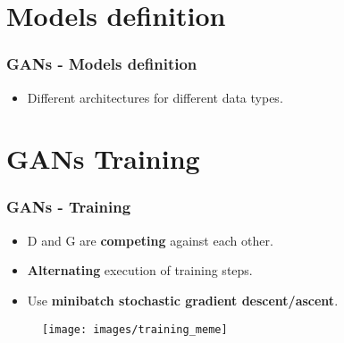 \documentclass{beamer}
\begin{document}
\section{Models definition}

\begin{frame}
	\frametitle{GANs - Models definition}
	\begin{itemize}
		\item Different architectures for different data types.
		\begin{itemize}
		\end{itemize}
	\end{itemize}



\end{frame}

\section{GANs Training}

\begin{frame}
	\frametitle{GANs - Training}
	\begin{itemize}
		\item D and G are \textbf{competing} against each other.
		\item \textbf{Alternating} execution of training steps.
		\item Use \textbf{minibatch stochastic gradient descent/ascent}.
	\end{itemize}
	\begin{figure}
		\centering
		\texttt{[image: images/training\_meme]}
	\end{figure}
\end{frame}
\end{document}

